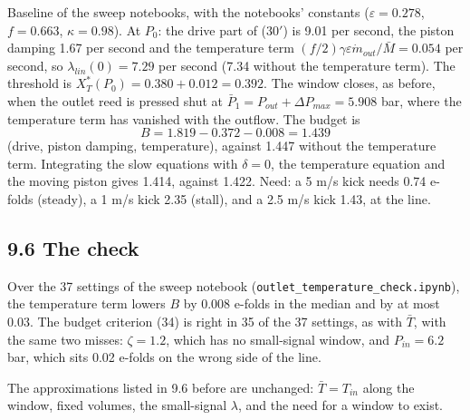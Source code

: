 \documentclass[11pt]{article}
\begin{document}
Baseline of the sweep notebooks, with the notebooks' constants ($\varepsilon = 0.278$, $f = 0.663$, $\kappa = 0.98$). At $P_0$: the drive part of (30$'$) is 9.01 per second, the piston damping 1.67 per second and the temperature term $(f/2)\gamma\varepsilon\dot m_{out}/\bar M = 0.054$ per second, so $\lambda_{lin}(0) = 7.29$ per second (7.34 without the temperature term). The threshold is $X^*_T(P_0) = 0.380 + 0.012 = 0.392$. The window closes, as before, when the outlet reed is pressed shut at $\bar P_1 = P_{out} + \Delta P_{max} = 5.908$ bar, where the temperature term has vanished with the outflow. The budget is
\[
B = 1.819 - 0.372 - 0.008 = 1.439
\]
(drive, piston damping, temperature), against 1.447 without the temperature term. Integrating the slow equations with $\delta = 0$, the temperature equation and the moving piston gives 1.414, against 1.422. Need: a 5 m/s kick needs 0.74 e-folds (steady), a 1 m/s kick 2.35 (stall), and a 2.5 m/s kick 1.43, at the line.

\subsection*{9.6 The check}

Over the 37 settings of the sweep notebook (\texttt{outlet\_temperature\_check.ipynb}), the temperature term lowers $B$ by 0.008 e-folds in the median and by at most 0.03. The budget criterion (34) is right in 35 of the 37 settings, as with $\bar T$, with the same two misses: $\zeta = 1.2$, which has no small-signal window, and $P_{in} = 6.2$ bar, which sits 0.02 e-folds on the wrong side of the line.

The approximations listed in 9.6 before are unchanged: $\bar T = T_{in}$ along the window, fixed volumes, the small-signal $\lambda$, and the need for a window to exist.
\end{document}
